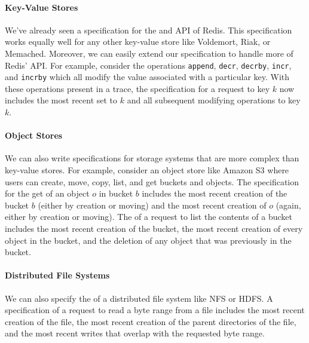 \paragraph{Key-Value Stores}
We've already seen a \watprovenance{} specification for the \kvget{} and
\kvset{} API of Redis. This specification works equally well for any other
key-value store like Voldemort, Riak, or Memached. 
Moreover, we can easily
extend our \watprovenance{} specification to handle more of Redis' API. For
example, consider the operations \texttt{append}, \texttt{decr},
\texttt{decrby}, \texttt{incr}, and \texttt{incrby} which all modify the value
associated with a particular key. With these operations present in a trace, the
\watprovenance{} specification for a \kvget{} request to key $k$ now includes
the most recent set to $k$ and all subsequent modifying operations to key $k$.

\paragraph{Object Stores}
We can also write \watprovenance{} specifications for storage systems that are
more complex than key-value stores. For example, consider an object store like
Amazon S3 where users can create, move, copy, list, and get buckets and
objects. The \watprovenance{} specification for the get of an object $o$ in
bucket $b$ includes the most recent creation of the bucket $b$ (either by
creation or moving) and the most recent creation of $o$ (again, either by
creation or moving). The \watprovenance{} of a request to list the contents of
a bucket includes the most recent creation of the bucket, the most recent
creation of every object in the bucket, and the deletion of any object that was
previously in the bucket. 

\paragraph{Distributed File Systems}
We can also specify the \watprovenance{} of a distributed file system like NFS
or HDFS. A \watprovenance{} specification of a request to read a byte range
from a file includes the most recent creation of the file, the most recent
creation of the parent directories of the file, and the most recent writes that
overlap with the requested byte range.  

